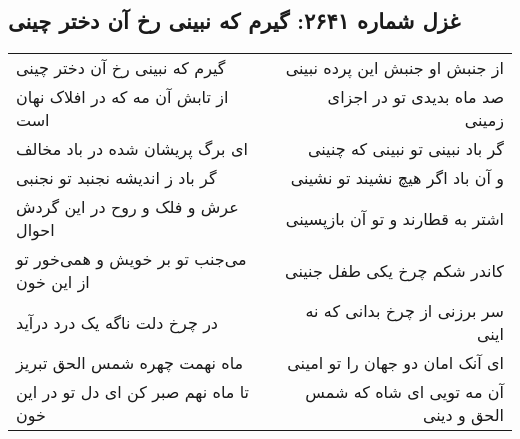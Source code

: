 \begin{center}
\section*{غزل شماره ۲۶۴۱: گیرم که نبینی رخ آن دختر چینی}
\label{sec:2641}
\begin{longtable}{l p{0.5cm} r}
گیرم که نبینی رخ آن دختر چینی
&&
از جنبش او جنبش این پرده نبینی
\\
از تابش آن مه که در افلاک نهان است
&&
صد ماه بدیدی تو در اجزای زمینی
\\
ای برگ پریشان شده در باد مخالف
&&
گر باد نبینی تو نبینی که چنینی
\\
گر باد ز اندیشه نجنبد تو نجنبی
&&
و آن باد اگر هیچ نشیند تو نشینی
\\
عرش و فلک و روح در این گردش احوال
&&
اشتر به قطارند و تو آن بازپسینی
\\
می‌جنب تو بر خویش و همی‌خور تو از این خون
&&
کاندر شکم چرخ یکی طفل جنینی
\\
در چرخ دلت ناگه یک درد درآید
&&
سر برزنی از چرخ بدانی که نه اینی
\\
ماه نهمت چهره شمس الحق تبریز
&&
ای آنک امان دو جهان را تو امینی
\\
تا ماه نهم صبر کن ای دل تو در این خون
&&
آن مه تویی ای شاه که شمس الحق و دینی
\\
\end{longtable}
\end{center}
